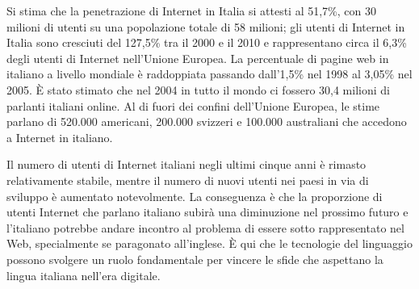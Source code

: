\begin{multicols}{2}
Si stima che la penetrazione di Internet in Italia si attesti al 51,7\%, con 30
milioni di utenti su una popolazione totale di 58 milioni; gli utenti di
Internet in Italia sono cresciuti del 127,5\% tra il 2000 e il 2010 e
rappresentano circa il 6,3\% degli utenti di Internet nell'Unione Europea. La
percentuale di pagine web in italiano a livello mondiale \`{e} raddoppiata
passando dall'1,5\% nel 1998 al 3,05\% nel 2005. \`{E} stato stimato che nel
2004 in tutto il mondo ci fossero 30,4 milioni di parlanti italiani online. Al
di fuori dei confini dell'Unione Europea, le stime parlano di 520.000
americani, 200.000 svizzeri e 100.000 australiani che accedono a Internet in
italiano.


Il numero di utenti di Internet italiani negli ultimi cinque anni \`{e}
rimasto relativamente stabile, mentre il numero di nuovi utenti nei paesi in
via di sviluppo \`{e} aumentato notevolmente. La conseguenza \`{e} che la
proporzione di utenti Internet che parlano italiano subir\`{a} una diminuzione
nel prossimo futuro e l'italiano potrebbe andare incontro al problema di
essere sotto rappresentato nel Web, specialmente se paragonato
all'inglese. \`{E} qui che le tecnologie del linguaggio possono svolgere un
ruolo fondamentale per vincere le sfide che aspettano la lingua italiana
nell'era digitale.



\end{multicols}
